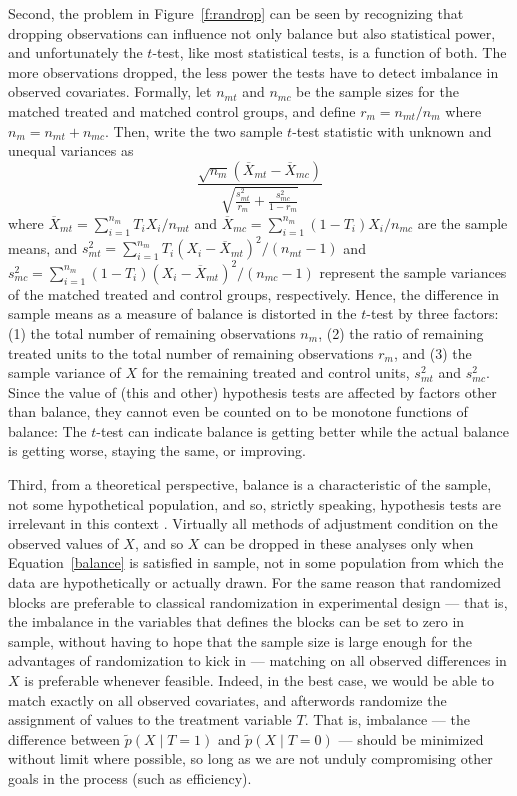 \documentclass[11pt,titlepage]{article}
\begin{document}
Second, the problem in Figure~\ref{f:randrop} can be seen by
recognizing that dropping observations can influence not only balance
but also statistical power, and unfortunately the $t$-test, like most
statistical tests, is a function of both.  The more observations
dropped, the less power the tests have to detect imbalance in observed
covariates.  Formally, let $n_{mt}$ and $n_{mc}$ be the sample sizes
for the matched treated and matched control groups, and define
$r_m=n_{mt}/n_m$ where $n_m=n_{mt}+n_{mc}$. Then, write the two sample
$t$-test statistic with unknown and unequal variances as
\begin{equation}
  \label{ttest} \frac{\sqrt{n_m}(\overline{X}_{mt}-\overline{X}_{mc})}
               {\sqrt{\frac{s^2_{mt}}{r_m} + \frac{s^2_{mc}}{1-r_m}}}
\end{equation}
where $\overline{X}_{mt}=\sum_{i=1}^{n_m} T_i X_i/n_{mt}$ and
$\overline{X}_{mc}=\sum_{i=1}^{n_m} (1-T_i)X_i/n_{mc}$ are the sample
means, and $s^2_{mt}=\sum_{i=1}^{n_m} T_i(X_i -
\overline{X}_{mt})^2/(n_{mt}-1)$ and $s^2_{mc}=\sum_{i=1}^{n_m}
(1-T_i)(X_i - \overline{X}_{mt})^2/(n_{mc}-1)$ represent the sample
variances of the matched treated and control groups, respectively.
Hence, the difference in sample means as a measure of balance is
distorted in the $t$-test by three factors: (1) the total number of
remaining observations $n_m$, (2) the ratio of remaining treated units
to the total number of remaining observations $r_m$, and (3) the
sample variance of $X$ for the remaining treated and control units,
$s_{mt}^2$ and $s_{mc}^2$.  Since the value of (this and other)
hypothesis tests are affected by factors other than balance, they
cannot even be counted on to be monotone functions of balance: The
$t$-test can indicate balance is getting better while the actual
balance is getting worse, staying the same, or improving.

Third, from a theoretical perspective, balance is a characteristic of
the sample, not some hypothetical population, and so, strictly
speaking, hypothesis tests are irrelevant in this context
\citep{HoImaKin06,Hansen06}.  Virtually all methods of adjustment
condition on the observed values of $X$, and so $X$ can be dropped in
these analyses only when Equation~\ref{balance} is satisfied in
sample, not in some population from which the data are hypothetically
or actually drawn.  For the same reason that randomized blocks are
preferable to classical randomization in experimental design --- that
is, the imbalance in the variables that defines the blocks can be set
to zero in sample, without having to hope that the sample size is
large enough for the advantages of randomization to kick in ---
matching on all observed differences in $X$ is preferable whenever
feasible.  Indeed, in the best case, we would be able to match exactly
on all observed covariates, and afterwords randomize the assignment of
values to the treatment variable $T$.  That is, imbalance --- the
difference between $\tilde p(X\mid T=1)$ and $\tilde p(X\mid T=0)$ ---
should be minimized without limit where possible, so long as we are
not unduly compromising other goals in the process (such as
efficiency).
\end{document}
